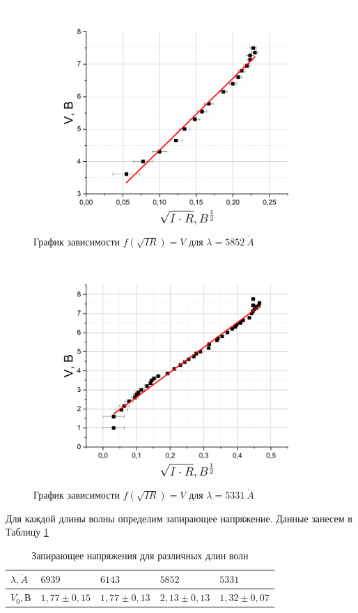 \documentclass[a4paper,12pt]{article}
\begin{document}
\begin{figure}[h!]
	\centering
	\includegraphics[width = 0.8\linewidth]{lambda = 5852 A}
	\caption{График зависимости $f(\sqrt{IR}) = V$ для $\lambda = 5852 \ \mathring{A}$}
	\label{graph4:5852 A}
\end{figure}

\begin{figure}[h!]
	\centering
	\includegraphics[width = 0.8\linewidth]{lambda = 5331 A}
	\caption{График зависимости $f(\sqrt{IR}) = V$ для $\lambda = 5331 \ \mathring{A}$}
	\label{graph5:5331 A}
\end{figure}

\pagebreak

Для каждой длины волны определим запирающее напряжение. Данные занесем в Таблицу \ref{table1:voltage}

\begin{table}[h!]
\centering
\caption{Запирающее напряжения для различных длин волн}
\begin{tabular}{|l|l|l|l|l|}
\hline
$\lambda, \mathring A$ & $6939$ & $6143$ & $5852$ & $5331$ \\ \hline
$V_0, В$ & $1,77 \pm 0,15$ & $1,77 \pm 0,13	$ & $2,13 \pm 0,13$ & $1,32 \pm 0,07$ \\ \hline
\end{tabular}
\label{table1:voltage}
\end{table}
\end{document}
